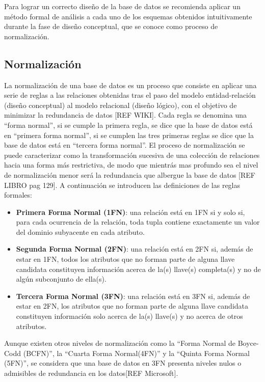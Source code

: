 \cite{bib1}

Para lograr un correcto diseño de la base de datos se recomienda aplicar un método formal de 
análisis a cada uno de los esquemas obtenidos intuitivamente durante la fase de diseño conceptual, 
que se conoce como proceso de normalización.

\subsection{Normalización}
La normalización de una base de datos es un proceso que consiste 
en aplicar una serie de reglas a las relaciones obtenidas 
tras el paso del modelo entidad-relación (diseño conceptual) al modelo 
relacional (diseño lógico), con el objetivo de minimizar la redundancia de datos [REF WIKI].
Cada regla se denomina una ``forma normal'', si se cumple la primera regla, se dice que 
la base de datos está en ``primera forma normal'', si se cumplen las tres 
primeras reglas se dice que la base de datos está en ``tercera forma normal''. El proceso de 
normalización se puede caracterizar como la transformación sucesiva de una colección de 
relaciones hacia una forma más restrictiva, de modo que mientrás mas profundo sea el nivel 
de normalización menor será la redundancia que albergue la base de datos [REF LIBRO pag 129].
A continuación se introducen las definiciones de las reglas formales:

\begin{itemize}
    \item \textbf{Primera Forma Normal (1FN)}: una relación está en 1FN si y solo si, para 
    cada ocurrencia de la relación, toda tupla contiene exactamente un valor del dominio subyacente en
    cada atributo.
    \item \textbf{Segunda Forma Normal (2FN)}: una relación está en 2FN si, además de estar en 
    1FN, todos los atributos que no forman parte de alguna llave candidata constituyen información 
    acerca de la(s) llave(s) completa(s) y no de algún subconjunto de ella(s).
    \item \textbf{Tercera Forma Normal (3FN)}: una relación está en 3FN si, además de estar en 2FN,
    los atributos que no forman parte de alguna llave candidata constituyen información solo acerca
    de la(s) llave(s) y no acerca de otros atributos.
\end{itemize}


Aunque existen otros niveles de normalización como la ``Forma Normal de Boyce-Codd (BCFN)'',
la ``Cuarta Forma Normal(4FN)'' y la ``Quinta Forma Normal (5FN)'',
se considera que una base de datos en 3FN presenta niveles nulos o 
admisibles de redundancia en los datos[REF Microsoft].





